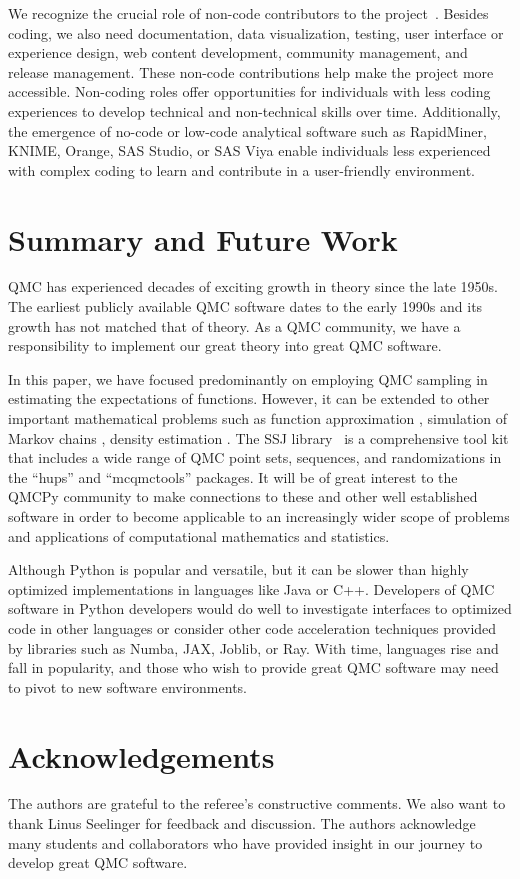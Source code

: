 \documentclass[graybox]{svmult}
\begin{document}
We recognize the crucial role of non-code contributors to the project~\cite{K23}. Besides coding, we also need documentation, data visualization, testing, user interface or experience design, web content development, community management, and release management. These non-code contributions help make the project more  accessible. Non-coding roles offer opportunities for individuals with less coding experiences to develop technical and non-technical skills over time.  Additionally, the emergence of no-code or low-code analytical software such as RapidMiner, KNIME, Orange, SAS Studio, or SAS Viya enable individuals less experienced with complex coding to learn and contribute in a user-friendly environment.


\section{Summary and Future Work}
QMC has experienced decades of exciting growth in theory since the late 1950s.  The earliest publicly available QMC software dates to the early 1990s and its growth has not matched that of theory.  As a QMC community, we have a responsibility to implement our great theory into great QMC software.

In this paper, we have focused predominantly on employing QMC sampling in estimating the expectations of functions. However, it can be extended to other important mathematical problems such as function approximation \cite{Kmmerer2015, PotSch21}, simulation of Markov chains \cite{l2018sorting,puchhammer2021variance},  density estimation \cite{LEcuyer2022b}.
The SSJ library~\cite{l2002ssj} is a comprehensive tool kit that includes a wide range of QMC point sets, sequences, and randomizations in the ``hups'' and ``mcqmctools'' packages. It will be of great interest to the QMCPy community to make connections to these and other well established software in order to become applicable to an increasingly wider scope of problems and applications of computational mathematics and statistics.

Although Python is popular and versatile, but it can be slower than highly optimized implementations in languages like Java or C++.  Developers of QMC software in Python  developers would do well to investigate interfaces to optimized code in other languages or consider other code acceleration techniques provided by libraries such as Numba, JAX, Joblib, or Ray.  With time, languages rise and fall in popularity, and those who wish to provide great QMC software may need to pivot to new software environments.


\section*{Acknowledgements}
The authors are grateful to the referee's constructive comments. We also want to thank Linus Seelinger for feedback and discussion. The authors acknowledge many students and collaborators who have provided insight in our journey to develop great QMC software.




\end{document}
